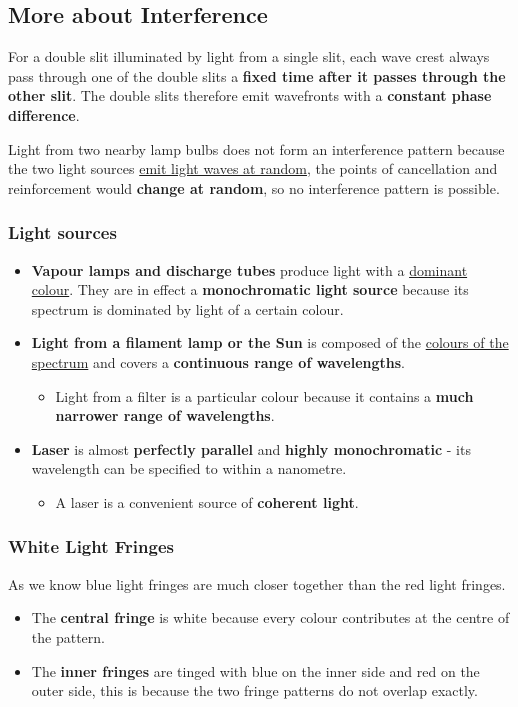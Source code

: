 \subsection{More about Interference}

For a double slit illuminated by light from a single slit, each wave crest always pass through one of the double slits a \textbf{fixed time after it passes through the other slit}. The double slits therefore emit wavefronts with a \textbf{constant phase difference}.

Light from two nearby lamp bulbs does not form an interference pattern because the two light sources \underline{emit light waves at random}, the points of cancellation and reinforcement would \textbf{change at random}, so no interference pattern is possible.

\subsubsection*{Light sources}

\begin{itemize}
    \item \textbf{Vapour lamps and discharge tubes} produce light with a \underline{dominant colour}. They are in effect a \textbf{monochromatic light source} because its spectrum is dominated by light of a certain colour.
    \item \textbf{Light from a filament lamp or the Sun} is composed of the \underline{colours of the spectrum} and covers a \textbf{continuous range of wavelengths}.
        \begin{itemize}
            \item Light from a filter is a particular colour because it contains a \textbf{much narrower range of wavelengths}.
        \end{itemize}
    \item \textbf{Laser} is almost \textbf{perfectly parallel} and \textbf{highly monochromatic} - its wavelength can be specified to within a nanometre.
        \begin{itemize}
            \item A laser is a convenient source of \textbf{coherent light}.
        \end{itemize}
\end{itemize}

\subsubsection*{White Light Fringes}
As we know blue light fringes are much closer together than the red light fringes.

\begin{itemize}
    \item The \textbf{central fringe} is white because every colour contributes at the centre of the pattern.
    \item The \textbf{inner fringes} are tinged with blue on the inner side and red on the outer side, this is because the two fringe patterns do not overlap exactly.
\end{itemize}
